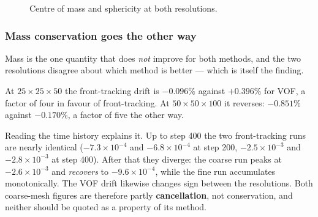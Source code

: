\begin{figure}[htbp]
\centering
{}\hfill
{}
\caption{Centre of mass and sphericity at both resolutions.}
\label{fig:resolution}
\end{figure}

\subsubsection{Mass conservation goes the other way}

Mass is the one quantity that does \emph{not} improve for both methods, and the
two resolutions disagree about which method is better --- which is itself the
finding.

At $25\times25\times50$ the front-tracking drift is $-0.096\%$ against
$+0.396\%$ for VOF, a factor of four in favour of front-tracking. At
$50\times50\times100$ it reverses: $-0.851\%$ against $-0.170\%$, a factor of
five the other way.

Reading the time history explains it. Up to step 400 the two front-tracking runs
are nearly identical ($-7.3\times10^{-4}$ and $-6.8\times10^{-4}$ at step 200,
$-2.5\times10^{-3}$ and $-2.8\times10^{-3}$ at step 400). After that they
diverge: the coarse run peaks at $-2.6\times10^{-3}$ and \emph{recovers} to
$-9.6\times10^{-4}$, while the fine run accumulates monotonically. The VOF drift
likewise changes sign between the resolutions. Both coarse-mesh figures are
therefore partly \textbf{cancellation}, not conservation, and neither should be
quoted as a property of its method.

